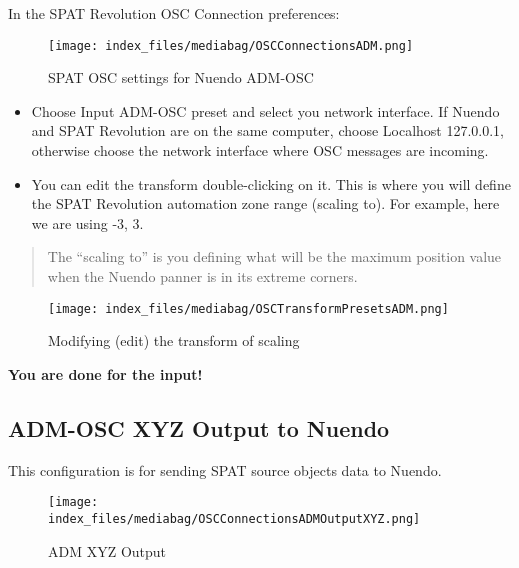 \documentclass[
  letterpaper,
  DIV=11,
  numbers=noendperiod]{scrreport}
\begin{document}
In the SPAT Revolution OSC Connection preferences:

\begin{figure}

{\centering \texttt{[image: index\_files/mediabag/OSCConnectionsADM.png]}

}

\caption{SPAT OSC settings for Nuendo ADM-OSC}

\end{figure}

\begin{itemize}
\item
  Choose Input ADM-OSC preset and select you network interface. If
  Nuendo and SPAT Revolution are on the same computer, choose Localhost
  127.0.0.1, otherwise choose the network interface where OSC messages
  are incoming.
\item
  You can edit the transform double-clicking on it. This is where you
  will define the SPAT Revolution automation zone range (scaling to).
  For example, here we are using -3, 3.
\end{itemize}

\begin{quote}
The ``scaling to'' is you defining what will be the maximum position
value when the Nuendo panner is in its extreme corners.
\end{quote}

\begin{figure}

{\centering \texttt{[image: index\_files/mediabag/OSCTransformPresetsADM.png]}

}

\caption{Modifying (edit) the transform of scaling}

\end{figure}

\textbf{You are done for the input!}

\hypertarget{adm-osc-xyz-output-to-nuendo}{%
\subsection{ADM-OSC XYZ Output to
Nuendo}\label{adm-osc-xyz-output-to-nuendo}}

This configuration is for sending SPAT source objects data to Nuendo.

\begin{figure}

{\centering \texttt{[image: index\_files/mediabag/OSCConnectionsADMOutputXYZ.png]}

}

\caption{ADM XYZ Output}

\end{figure}
\end{document}
